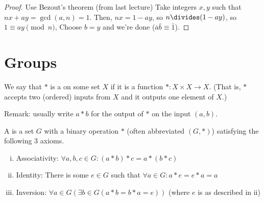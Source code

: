 \documentclass[notes.tex]{subfiles}
\begin{document}
\begin{proof}
	Use Bezout's theorem (from last lecture)
	Take integers $x, y$ such that $nx+ay = \gcd(a, n)=1$.
	Then, $nx = 1-ay$, so $n\divides (1-ay)$, so $1\equiv ay\pmod n$, Choose $b=y$ and we're done ($\bar a \bar b \equiv \bar 1$).
\end{proof}

\chapter*{Groups}

\begin{definition}
	We say that $*$ is a  on some set $X$ if it is a function $*:X\times X \to X$. (That is, $*$ accepts two (ordered) inputs from $X$ and it outputs one element of $X$.)
\end{definition}

Remark: usually write $a*b$ for the output of $*$ on the input $(a, b)$.

\begin{definition}
	A  is a set $G$ with a binary operation $*$ (often abbreviated $(G, *)$) satisfying the following 3 axioms.
\end{definition}
\begin{enumerate}[i.]
	\item Associativity: $\forall a, b, c\in G: (a*b) *c = a*(b*c)$
	\item Identity: There is some $e\in G$ such that $\forall a\in G: a*e = e*a = a$
	\item Inversion: $\forall a\in G(\exists b\in G(a*b=b*a = e))$ (where $e$ is as described in ii)
\end{enumerate}
\end{document}
